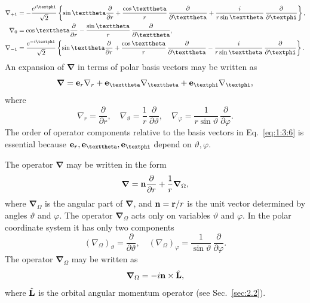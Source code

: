 \begin{align}
\nabla_{+1} & =-\frac{e^{i \varphi}}{\sqrt{2}}\left\{\sin \vartheta \frac{\partial}{\partial r}+\frac{\cos \vartheta}{r} \, \frac{\partial}{\partial \vartheta}+\frac{i}{r \sin \vartheta} \, \frac{\partial}{\partial \varphi}\right\},  \notag\\
\nabla_{0} & =\cos \vartheta \frac{\partial}{\partial r}-\frac{\sin \vartheta}{r} \, \frac{\partial}{\partial \vartheta},  \label{eq:1:3:5}\\
\nabla_{-1} & =\frac{e^{-i \varphi}}{\sqrt{2}}\left\{\sin \vartheta \frac{\partial}{\partial r}+\frac{\cos \vartheta}{r} \, \frac{\partial}{\partial \vartheta}-\frac{i}{r \sin \vartheta} \, \frac{\partial}{\partial \varphi}\right\} . \notag
\end{align}
An expansion of \(\boldsymbol{\nabla}\) in terms of polar basis vectors may be written as
\begin{equation}
\boldsymbol{\nabla}=\vect{e}_{r} \nabla_{r}+\vect{e}_{\vartheta} \nabla_{\vartheta}+\vect{e}_{\varphi} \nabla_{\varphi}, \label{eq:1:3:6}
\end{equation}
where
\begin{equation}
\nabla_{r}=\frac{\partial}{\partial r}, \quad \nabla_{\vartheta}=\frac{1}{r} \, \frac{\partial}{\partial \vartheta}, \quad \nabla_{\varphi}=\frac{1}{r \sin \vartheta} \, \frac{\partial}{\partial \varphi} . \label{eq:1:3:7}
\end{equation}
The order of operator components relative to the basis vectors in Eq.~\eqref{eq:1:3:6} is essential because \(\vect{e}_{r}, \vect{e}_{\vartheta}, \vect{e}_{\varphi}\) depend on \(\vartheta, \varphi\).

The operator $\boldsymbol{\nabla}$ may be written in the form
\begin{equation}
\boldsymbol{\nabla}=\mathbf{n} \frac{\partial}{\partial r}+\frac{1}{r} \boldsymbol\nabla_{\Omega}, \label{eq:1:3:8}
\end{equation}
where \(\boldsymbol{\nabla}_{\Omega}\) is the angular part of \(\boldsymbol{\nabla}\), and \(\mathbf{n}=\mathbf{r} / r\) is the unit vector determined by angles \(\vartheta\) and \(\varphi\). The operator \(\boldsymbol{\nabla}_{\Omega}\) acts only on variables \(\vartheta\) and \(\varphi\). In the polar coordinate system it has only two components
\begin{equation}
\left(\nabla_{\Omega}\right)_{\vartheta}=\frac{\partial}{\partial \vartheta}, \quad\left(\nabla_{\Omega}\right)_{\varphi}=\frac{1}{\sin \vartheta} \, \frac{\partial}{\partial \varphi} . \label{eq:1:3:9}
\end{equation}
The operator \(\boldsymbol{\nabla}_{\Omega}\) may be written as
\begin{equation}
\boldsymbol{\nabla}_{\Omega}=-i \mathbf{n} \times \hat{\mathbf{L}}, \label{eq:1:3:10}
\end{equation}
where \(\hat{\mathbf{L}}\) is the orbital angular momentum operator (see Sec.~\ref{sec:2.2}).

